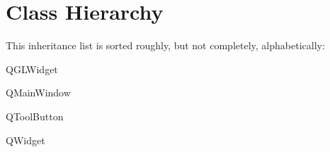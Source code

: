 \section{Class Hierarchy}
This inheritance list is sorted roughly, but not completely, alphabetically\-:\begin{DoxyCompactList}
\item {}
\item Q\-G\-L\-Widget\begin{DoxyCompactList}
\item {}
\end{DoxyCompactList}
\item Q\-Main\-Window\begin{DoxyCompactList}
\item {}
\end{DoxyCompactList}
\item Q\-Tool\-Button\begin{DoxyCompactList}
\item {}
\end{DoxyCompactList}
\item Q\-Widget\begin{DoxyCompactList}
\item {}
\end{DoxyCompactList}
\item {}
\end{DoxyCompactList}
